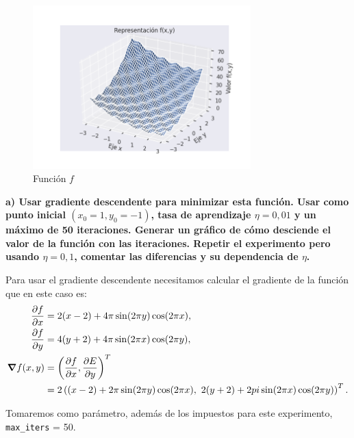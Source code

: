 \documentclass[a4paper, 20pt]{article}
\begin{document}
\begin{figure}[H]
    \centering
    \includegraphics[width=0.75\textwidth]{f1}
    \caption{Función $f$}
    \label{fig:f1}
\end{figure}

\textbf{a) Usar gradiente descendente para minimizar esta función. Usar como punto inicial $(x_0 = 1, y_0 = -1)$, tasa de aprendizaje $\eta = 0,01$ y un máximo de 50 iteraciones.
Generar un gráfico de cómo desciende el valor de la función con las iteraciones. Repetir
el experimento pero usando $\eta = 0,1$, comentar las diferencias y su dependencia de $\eta$.}

Para usar el gradiente descendente necesitamos calcular el gradiente de la función que en este caso es:
\begin{align*}
\pdv{f}{x}(x,y) &= 2(x-2) + 4\pi \sin(2\pi y) \cos(2\pi x),\\
\pdv{f}{y}(x,y) &= 4(y+2)+4\pi \sin(2\pi x) \cos(2\pi y),\\
\grad{f}(x,y) &= \left(\pdv{f}{x}(x,y), \pdv{E}{y}(x,y)\right)^T\\
	      &= 2\left((x-2) + 2\pi \sin(2\pi y) \cos(2\pi x),\ 2(y+2)+2pi \sin(2\pi x) \cos(2\pi y)\right)^T.
\end{align*}

Tomaremos como parámetro, además de los impuestos para este experimento, \texttt{max\_iters} = 50.
\end{document}
